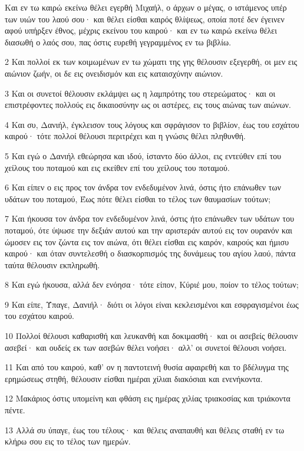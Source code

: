 \par Και εν τω καιρώ εκείνω θέλει εγερθή Μιχαήλ, ο άρχων ο μέγας, ο ιστάμενος υπέρ των υιών του λαού σου· και θέλει είσθαι καιρός θλίψεως, οποία ποτέ δεν έγεινεν αφού υπήρξεν έθνος, μέχρις εκείνου του καιρού· και εν τω καιρώ εκείνω θέλει διασωθή ο λαός σου, πας όστις ευρεθή γεγραμμένος εν τω βιβλίω.
\par 2 Και πολλοί εκ των κοιμωμένων εν τω χώματι της γης θέλουσιν εξεγερθή, οι μεν εις αιώνιον ζωήν, οι δε εις ονειδισμόν και εις καταισχύνην αιώνιον.
\par 3 Και οι συνετοί θέλουσιν εκλάμψει ως η λαμπρότης του στερεώματος· και οι επιστρέφοντες πολλούς εις δικαιοσύνην ως οι αστέρες, εις τους αιώνας των αιώνων.
\par 4 Και συ, Δανιήλ, έγκλεισον τους λόγους και σφράγισον το βιβλίον, έως του εσχάτου καιρού· τότε πολλοί θέλουσι περιτρέχει και η γνώσις θέλει πληθυνθή.
\par 5 Και εγώ ο Δανιήλ εθεώρησα και ιδού, ίσταντο δύο άλλοι, εις εντεύθεν επί του χείλους του ποταμού και εις εκείθεν επί του χείλους του ποταμού.
\par 6 Και είπεν ο εις προς τον άνδρα τον ενδεδυμένον λινά, όστις ήτο επάνωθεν των υδάτων του ποταμού, Έως πότε θέλει είσθαι το τέλος των θαυμασίων τούτων;
\par 7 Και ήκουσα τον άνδρα τον ενδεδυμένον λινά, όστις ήτο επάνωθεν των υδάτων του ποταμού, ότε ύψωσε την δεξιάν αυτού και την αριστεράν αυτού εις τον ουρανόν και ώμοσεν εις τον ζώντα εις τον αιώνα, ότι θέλει είσθαι εις καιρόν, καιρούς και ήμισυ καιρού· και όταν συντελεσθή ο διασκορπισμός της δυνάμεως του αγίου λαού, πάντα ταύτα θέλουσιν εκπληρωθή.
\par 8 Και εγώ ήκουσα, αλλά δεν ενόησα· τότε είπον, Κύριέ μου, ποίον το τέλος τούτων;
\par 9 Και είπε, Ύπαγε, Δανιήλ· διότι οι λόγοι είναι κεκλεισμένοι και εσφραγισμένοι έως του εσχάτου καιρού.
\par 10 Πολλοί θέλουσι καθαρισθή και λευκανθή και δοκιμασθή· και οι ασεβείς θέλουσιν ασεβεί· και ουδείς εκ των ασεβών θέλει νοήσει· αλλ' οι συνετοί θέλουσι νοήσει.
\par 11 Και από του καιρού, καθ' ον η παντοτεινή θυσία αφαιρεθή και το βδέλυγμα της ερημώσεως στηθή, θέλουσιν είσθαι ημέραι χίλιαι διακόσιαι και ενενήκοντα.
\par 12 Μακάριος όστις υπομείνη και φθάση εις ημέρας χιλίας τριακοσίας και τριάκοντα πέντε.
\par 13 Αλλά συ ύπαγε, έως του τέλους· και θέλεις αναπαυθή και θέλεις σταθή εν τω κλήρω σου εις το τέλος των ημερών.


